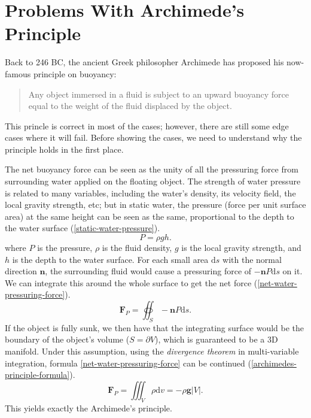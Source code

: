 \section{Problems With Archimede's Principle}

Back to 246 BC, the ancient Greek philosopher Archimede has proposed his now-famous principle on buoyancy:
\begin{quote}
	Any object immersed in a fluid is subject to an upward buoyancy force equal to the weight of the fluid displaced by the object.
\end{quote}
This princle is correct in most of the cases;
however, there are still some edge cases where it will fail.
Before showing the cases, we need to understand why the principle holds in the first place.

The net buoyancy force can be seen as the unity of all the pressuring force from surrounding water applied on the floating object.
The strength of water pressure is related to many variables, including the water's density, its velocity field, the local gravity strength, etc;
but in static water, the pressure (force per unit surface area) at the same height can be seen as the same, proportional to the depth to the water surface (\ref{static-water-pressure}).
\begin{equation}
	P=\rho gh.
	\label{static-water-pressure}
\end{equation}
where $P$ is the pressure, $\rho$ is the fluid density, $g$ is the local gravity strength, and $h$ is the depth to the water surface.
For each small area $\mathrm{d}s$ with the normal direction $\mathbf n$, the surrounding fluid would cause a pressuring force of $-\mathbf nP\mathrm{d}s$ on it.
We can integrate this around the whole surface to get the net force (\ref{net-water-pressuring-force}).
\begin{equation}
	\mathbf{F}_P=\oiint_{S}-\mathbf nP\mathrm{d}s.
	\label{net-water-pressuring-force}
\end{equation}
If the object is fully sunk, we then have that the integrating surface would be the boundary of the object's volume ($S=\partial V$), which is guaranteed to be a 3D manifold.
Under this assumption, using the \emph{divergence theorem} in multi-variable integration, formula \ref{net-water-pressuring-force} can be continued (\ref{archimedes-principle-formula}).
\begin{equation}
	\mathbf{F}_P=\iiint_{V}\rho\mathrm{d}v=-\rho\mathbf{g}|V|.
	\label{archimedes-principle-formula}
\end{equation}
This yields exactly the Archimede's principle.

